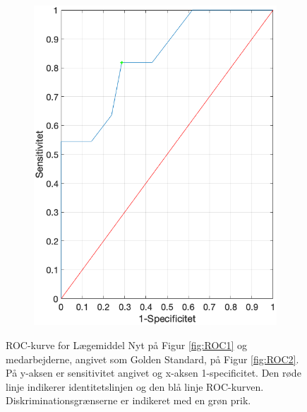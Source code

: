 \begin{figure} [H]
\begin{subfigure}{0.49\textwidth}
		\includegraphics[width=\textwidth]{billeder/ROC1.png}
	\end{subfigure}
	\vspace{-0.5cm}
\caption{ROC-kurve for Lægemiddel Nyt på Figur \ref{fig:ROC1} og medarbejderne, angivet som Golden Standard, på Figur \ref{fig:ROC2}. På y-aksen er sensitivitet angivet og x-aksen 1-specificitet. Den røde linje indikerer identitetslinjen og den blå linje ROC-kurven. Diskriminationsgrænserne er indikeret med en grøn prik.}
\label{fig:ROC}
\end{figure} 

